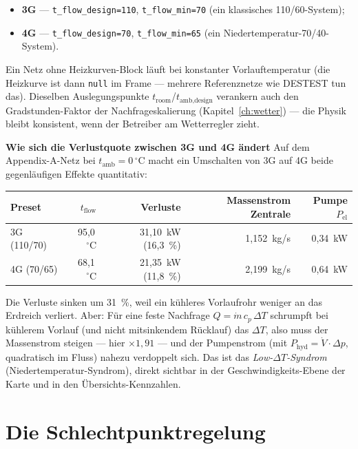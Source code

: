 \documentclass[11pt,a4paper,parskip=half]{scrreprt}
\newcommand{\ui}[1]{\textsf{\bfseries #1}}
\newcommand{\gC}{\,\ensuremath{{}^{\circ}\mathrm{C}}}
\newenvironment{beispiel}[1][Beispiel]
  {\par\medskip{\color{bsp}\hrule height 0.8pt}\nopagebreak\smallskip
   \noindent\textbf{\textsf{\textcolor{bsp}{#1}}}\quad\ignorespaces}
  {\par\nopagebreak\smallskip{\color{bsp}\hrule height 0.8pt}\par\medskip}
\begin{document}
\begin{itemize}[nosep]
  \item \ui{3G} --- \texttt{t\_flow\_design=110}, \texttt{t\_flow\_min=70}
    (ein klassisches 110/60-System);
  \item \ui{4G} --- \texttt{t\_flow\_design=70}, \texttt{t\_flow\_min=65}
    (ein Niedertemperatur-70/40-System).
\end{itemize}

Ein Netz ohne Heizkurven-Block läuft bei konstanter Vorlauftemperatur (die
Heizkurve ist dann \texttt{null} im Frame --- mehrere Referenznetze wie DESTEST
tun das). Dieselben Auslegungspunkte $t_\text{room}$/$t_\text{amb,design}$
verankern auch den Gradstunden-Faktor der Nachfrageskalierung
(Kapitel~\ref{ch:wetter}) --- die Physik bleibt konsistent, wenn der Betreiber
am Wetterregler zieht.

\begin{beispiel}[Wie sich die Verlustquote zwischen 3G und 4G ändert]
Auf dem Appendix-A-Netz bei $t_\text{amb}=0\gC$ macht ein Umschalten von 3G auf
4G beide gegenläufigen Effekte quantitativ:

{\small
\begin{center}
\begin{tabular}{@{}lrrrr@{}}
\toprule
Preset & $t_\text{flow}$ & Verluste & Massenstrom Zentrale & Pumpe $P_\text{el}$ \\
\midrule
3G (110/70) & 95{,}0\gC & 31{,}10~kW (16{,}3~\%) & 1{,}152~kg/s & 0{,}34~kW \\
4G (70/65)  & 68{,}1\gC & 21{,}35~kW (11{,}8~\%) & 2{,}199~kg/s & 0{,}64~kW \\
\bottomrule
\end{tabular}
\end{center}}

Die Verluste sinken um 31~\%, weil ein kühleres Vorlaufrohr weniger an das
Erdreich verliert. Aber: Für eine feste Nachfrage $Q=\dot m\,c_p\,\Delta T$
schrumpft bei kühlerem Vorlauf (und nicht mitsinkendem Rücklauf) das $\Delta T$,
also muss der Massenstrom steigen --- hier $\times 1{,}91$ --- und der
Pumpenstrom (mit $P_\text{hyd}=\dot V\cdot\Delta p$, quadratisch im Fluss)
nahezu verdoppelt sich. Das ist das \emph{Low-$\Delta T$-Syndrom}
(Niedertemperatur-Syndrom), direkt sichtbar in der Geschwindigkeits-Ebene der
Karte und in den Übersichts-Kennzahlen.
\end{beispiel}

\section{Die Schlechtpunktregelung}
\label{sec:schlechtpunkt}
\end{document}

